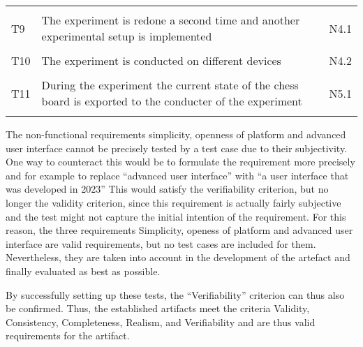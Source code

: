 \begin{table}[htbp]
\begin{tabular}{L{0.04\textwidth}L{0.7\textwidth}L{0.15\textwidth}}
    & \\
    T9  & The experiment is redone a second time and another experimental setup is implemented                                                     & N4.1                         \\
    & \\
    T10 & The experiment is conducted on different devices                                                                                         & N4.2                         \\
    & \\
    T11 & During the experiment the current state of the chess board is exported to the conducter of the experiment                                & N5.1                         \\ 
    & \\ \hline
    \end{tabular}
    \end{table}

The non-functional requirements simplicity, openness of platform and advanced user interface cannot be precisely tested by a test case due to their subjectivity. One way to counteract this would be to formulate the requirement more precisely and for example to replace \enquote{advanced user interface} with \enquote{a user interface that was developed in 2023} This would satisfy the verifiability criterion, but no longer the validity criterion, since this requirement is actually fairly subjective and the test might not capture the initial intention of the requirement. For this reason, the three requirements Simplicity, openess of platform and advanced user interface are valid requirements, but no test cases are included for them. Nevertheless, they are taken into account in the development of the artefact and finally evaluated as best as possible.

By successfully setting up these tests, the \enquote{Verifiability} criterion can thus also be confirmed. Thus, the established artifacts meet the criteria Validity, Consistency, Completeness, Realism, and Verifiability and are thus valid requirements for the artifact.






